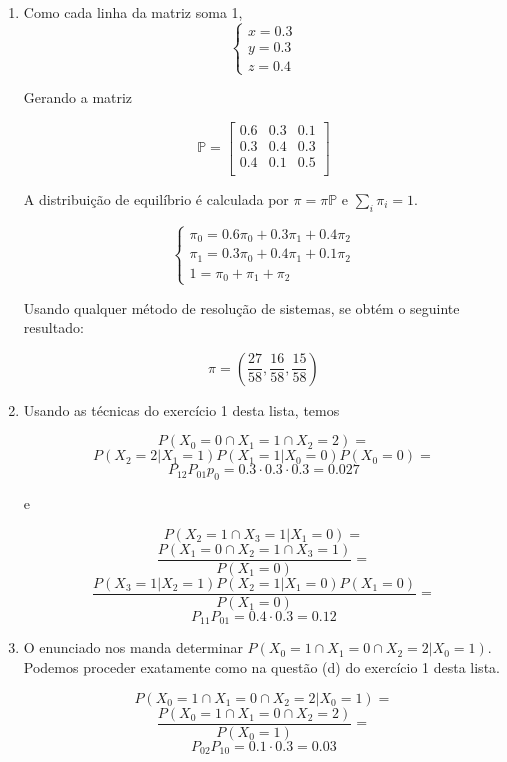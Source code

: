 \documentclass{article}
\begin{document}
\begin{enumerate}[label=(\alph*)]
    \item Como cada linha da matriz soma 1,
    $$\begin{cases}
      x=0.3\\
      y=0.3\\
      z=0.4
    \end{cases}$$
    
    Gerando a matriz
    
    $$\mathbb{P}=\begin{bmatrix}
        0.6 & 0.3 & 0.1\\
        0.3 & 0.4 & 0.3\\
        0.4 & 0.1 & 0.5\\
    \end{bmatrix}$$
    
    A distribuição de equilíbrio é calculada por $\pi=\pi\mathbb{P}$ e $\sum_i{\pi_i}=1$.
    
    $$\begin{cases}
      \pi_0 = 0.6\pi_0+0.3\pi_1+0.4\pi_2\\
      \pi_1 = 0.3\pi_0+0.4\pi_1+0.1\pi_2\\
      1 = \pi_0 + \pi_1 + \pi_2
    \end{cases}$$
    
    Usando qualquer método de resolução de sistemas, se obtém o seguinte resultado:
    
    $$\pi=(\frac{27}{58}, \frac{16}{58}, \frac{15}{58})$$

    \newpage

    \item Usando as técnicas do exercício 1 desta lista, temos
    
    $$P(X_0=0\cap X_1=1\cap X_2=2) = $$
    $$P(X_2=2|X_1=1)P(X_1=1|X_0=0)P(X_0=0) = $$
    $$P_{12}P_{01}p_0 = 0.3\cdot 0.3\cdot 0.3 = 0.027$$
    
    e

    $$P(X_2=1\cap X_3=1|X_1=0) = $$
    $$\frac{P(X_1=0\cap X_2=1\cap X_3=1)}{P(X_1=0)} = $$
    $$\frac{P(X_3=1|X_2=1)P(X_2=1|X_1=0)P(X_1=0)}{P(X_1=0)} = $$
    $$P_{11}P_{01} = 0.4\cdot 0.3 = 0.12$$
    
    \item O enunciado nos manda determinar $P(X_0=1\cap X_1=0\cap X_2=2|X_0=1)$. Podemos proceder exatamente como na questão (d) do exercício 1 desta lista.
    
    $$P(X_0=1\cap X_1=0\cap X_2=2|X_0=1) =$$
    $$\frac{P(X_0=1\cap X_1=0\cap X_2=2)}{P(X_0=1)} =$$
    $$P_{02}P_{10} = 0.1\cdot 0.3 = 0.03$$

\end{enumerate}
\end{document}

